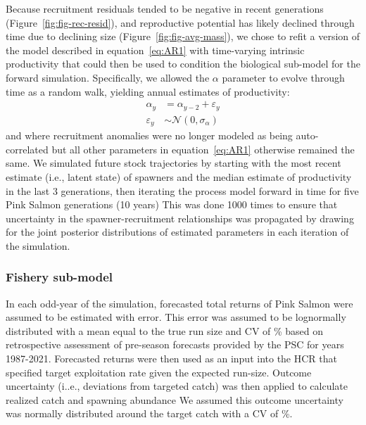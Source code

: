 \documentclass[french,11pt]{book}
\begin{document}
Because recruitment residuals tended to be negative in recent generations (Figure~\ref{fig:fig-rec-resid}), and reproductive potential has likely declined through time due to declining size (Figure~\ref{fig:fig-avg-mass}), we chose to refit a version of the model described in equation~\ref{eq:AR1} with time-varying intrinsic productivity that could then be used to condition the biological sub-model for the forward simulation. Specifically, we allowed the \(\alpha\) parameter to evolve through time as a random walk, yielding annual estimates of productivity:
\begin{equation}
\begin{aligned}
\alpha_y &= \alpha_{y-2} + \varepsilon_y \\
\varepsilon_y &\sim \mathcal{N}(0, \sigma_\alpha)
\end{aligned}
\label{eq:tv-alpha}
\end{equation}
and where recruitment anomalies were no longer modeled as being auto-correlated but all other parameters in equation~\ref{eq:AR1} otherwise remained the same. We simulated future stock trajectories by starting with the most recent estimate (i.e., latent state) of spawners and the median estimate of productivity in the last 3 generations, then iterating the process model forward in time for five Pink Salmon generations (10 years) This was done 1000 times to ensure that uncertainty in the spawner-recruitment relationships was propagated by drawing for the joint posterior distributions of estimated parameters in each iteration of the simulation.

\hypertarget{fishery-sub-model}{%
\subsubsection{Fishery sub-model}\label{fishery-sub-model}}

In each odd-year of the simulation, forecasted total returns of Pink Salmon were assumed to be estimated with error. This error was assumed to be lognormally distributed with a mean equal to the true run size and CV of \% based on retrospective assessment of pre-season forecasts provided by the PSC for years 1987-2021. Forecasted returns were then used as an input into the HCR that specified target exploitation rate given the expected run-size. Outcome uncertainty (i..e., deviations from targeted catch) was then applied to calculate realized catch and spawning abundance We assumed this outcome uncertainty was normally distributed around the target catch with a CV of \%.
\end{document}

